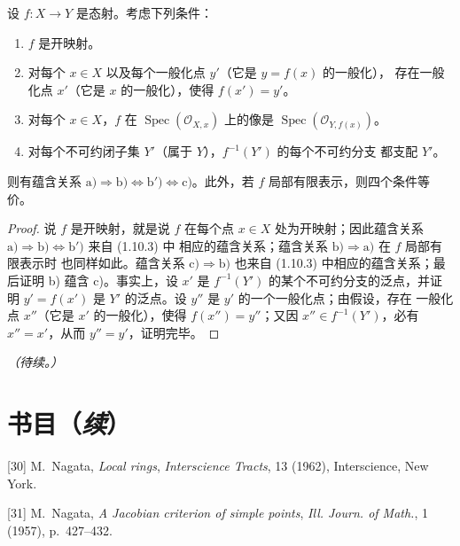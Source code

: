 \begin{corollary}[1.10.4]
\label{IV.1.10.4-fr}
设 $f:X\to Y$ 是态射。考虑下列条件：
\begin{enumerate}
  \item[a)] $f$ 是开映射。
  \item[b)] 对每个 $x\in X$ 以及每个一般化点 $y'$（它是 $y=f(x)$ 的一般化），
  存在一般化点 $x'$（它是 $x$ 的一般化），使得 $f(x')=y'$。
  \item[b')] 对每个 $x\in X$，$f$ 在
  $\operatorname{Spec}(\mathcal O_{X,x})$ 上的像是
  $\operatorname{Spec}(\mathcal O_{Y,f(x)})$。
  \item[c)] 对每个不可约闭子集 $Y'$（属于 $Y$），$f^{-1}(Y')$ 的每个不可约分支
  都支配 $Y'$。
\end{enumerate}
则有蕴含关系
$\mathrm{a)}\Rightarrow\mathrm{b)}\Leftrightarrow\mathrm{b')}
\Leftrightarrow\mathrm{c)}$。此外，若 $f$ 局部有限表示，则四个条件等价。
\end{corollary}

\begin{proof}
说 $f$ 是开映射，就是说 $f$ 在每个点 $x\in X$ 处为开映射；因此蕴含关系
$\mathrm{a)}\Rightarrow\mathrm{b)}\Leftrightarrow\mathrm{b')}$ 来自 (1.10.3) 中
相应的蕴含关系；蕴含关系 $\mathrm{b)}\Rightarrow\mathrm{a)}$ 在 $f$ 局部有限表示时
也同样如此。蕴含关系
$\mathrm{c)}\Rightarrow\mathrm{b)}$ 也来自 (1.10.3) 中相应的蕴含关系；最后证明
b) 蕴含 c)。事实上，设 $x'$ 是 $f^{-1}(Y')$ 的某个不可约分支的泛点，并证明
$y'=f(x')$ 是 $Y'$ 的泛点。设 $y''$ 是 $y'$ 的一个一般化点；由假设，存在
一般化点 $x''$（它是 $x'$ 的一般化），使得 $f(x'')=y''$；又因
$x''\in f^{-1}(Y')$，必有 $x''=x'$，从而 $y''=y'$，证明完毕。
\end{proof}

\begin{center}
\emph{（待续。）}
\end{center}

\clearpage
{}
{}
\section*{书目（\emph{续}）}

\begingroup
\small
\setlength{\parindent}{0pt}
\setlength{\parskip}{3pt}
[30] M.~Nagata, \emph{Local rings}, \emph{Interscience Tracts}, 13 (1962),
Interscience, New York.

[31] M.~Nagata, \emph{A Jacobian criterion of simple points},
\emph{Ill. Journ. of Math.}, 1 (1957), p.~427--432.

